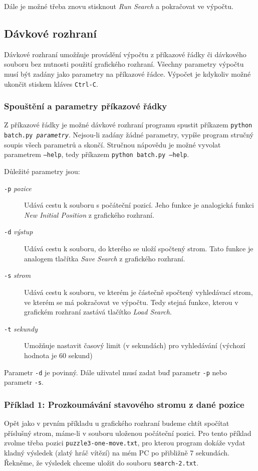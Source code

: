 \documentclass{article}
\begin{document}
Dále je možné třeba znovu stisknout \emph{Run Search} a pokračovat ve výpočtu.

\subsection{Dávkové rozhraní}
Dávkové rozhraní umožňuje provádění výpočtu z příkazové řádky či dávkového souboru bez nutnosti použití grafického
rozhraní. Všechny parametry výpočtu musí být zadány jako parametry na příkazové řádce. Výpočet je kdykoliv možné ukončit
stiskem kláves \texttt{Ctrl-C}.

\subsubsection{Spouštění a parametry příkazové řádky}
Z příkazové řádky je možné dávkové rozhraní programu spustit příkazem \texttt{python batch.py \textit{parametry}}.
Nejsou-li zadány žádné parametry, vypíše program stručný soupis všech parametrů a skončí. Stručnou nápovědu je možné
vyvolat parametrem \texttt{--help}, tedy příkazem \texttt{python batch.py --help}.

Důležité parametry jsou:\begin{description}
  \item[\texttt{-p} \textit{pozice}] Udává cestu k souboru s počáteční pozicí. Jeho funkce je analogická funkci
  \emph{New Initial Position} z grafického rozhraní.
  \item[\texttt{-d} \textit{výstup}] Udává cestu k souboru, do kterého se uloží spočtený strom. Tato funkce je analogem
  tlačítka \emph{Save Search} z grafického rozhraní.
  \item[\texttt{-s} \textit{strom}] Udává cestu k souboru, ve kterém je částečně spočtený vyhledávací strom, ve kterém
  se má pokračovat ve výpočtu. Tedy stejná funkce, kterou v grafickém rozhraní zastává tlačítko \emph{Load Search}.
  \item[\texttt{-t} \textit{sekundy}] Umožňuje nastavit časový limit (v sekundách) pro vyhledávání (výchozí hodnota je
  60 sekund)
\end{description}

Parametr \texttt{-d} je povinný. Dále uživatel musí zadat buď parametr \texttt{-p} nebo parametr \texttt{-s}.

\subsubsection{Příklad 1: Prozkoumávání stavového stromu z dané pozice}
Opět jako v prvním příkladu u grafického rozhraní budeme chtít spočítat příslušný strom, máme-li v souboru uloženou
počáteční pozici. Pro tento příklad zvolme třeba pozici \texttt{puzzle3-one-move.txt}, pro kterou program dokáže vydat
kladný výsledek (zlatý hráč vítězí) na mém PC po přibližně 7 sekundách. Řekněme, že výsledek chceme uložit do souboru
\texttt{search-2.txt}.
\end{document}
